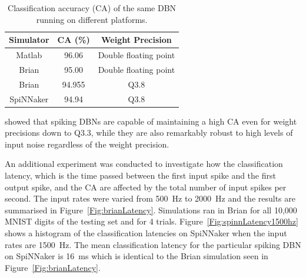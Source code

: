 \begin{table}[h]
\caption{Classification accuracy (CA) of the same DBN running on different platforms.}
\begin{center}
\begin{tabular} {c|c|c}
	Simulator & CA (\%) & Weight Precision \\
    \hline
    Matlab & 96.06 & Double floating point\\
    Brian & 95.00 & Double floating point\\
    Brian & 94.955 & Q3.8\\
    SpiNNaker & 94.94 & Q3.8\\
\end{tabular}
\label{tab:casimulators}
\end{center}
\end{table}


\citet{stromateldbn} showed that spiking DBNs are capable of maintaining a high CA even for weight precisions down to Q3.3, while they are also remarkably robust to high levels of input noise regardless of the weight precision. 


An additional experiment was conducted to investigate how the classification latency, which is the time passed between the first input spike and the first output spike, and the CA are affected by the total number of input spikes per second. The input rates were varied from 500~Hz to 2000~Hz and the results are summarised in Figure~\ref{Fig:brianLatency}. Simulations ran in Brian for all 10,000 MNIST digits of the testing set and for 4 trials. Figure~\ref{Fig:spinnLatency1500hz} shows a histogram of the classification latencies on SpiNNaker when the input rates are 1500~Hz. The mean classification latency for the particular spiking DBN on SpiNNaker is 16~ms which is identical to the Brian simulation seen in Figure~\ref{Fig:brianLatency}.


